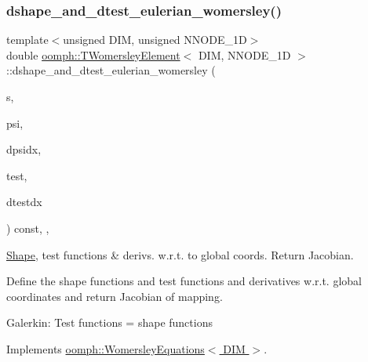 \mbox{\label{classoomph_1_1TWomersleyElement_a745f06fe3f040dfe800fb09be9f38f1e}} 
\subsubsection{\texorpdfstring{dshape\+\_\+and\+\_\+dtest\+\_\+eulerian\+\_\+womersley()}{dshape\_and\_dtest\_eulerian\_womersley()}}
{\footnotesize\ttfamily template$<$unsigned D\+IM, unsigned N\+N\+O\+D\+E\+\_\+1D$>$ \\
double \hyperlink{classoomph_1_1TWomersleyElement}{oomph\+::\+T\+Womersley\+Element}$<$ D\+IM, N\+N\+O\+D\+E\+\_\+1D $>$\+::dshape\+\_\+and\+\_\+dtest\+\_\+eulerian\+\_\+womersley (\begin{DoxyParamCaption}\item[{const \hyperlink{classoomph_1_1Vector}{Vector}$<$ double $>$ \&}]{s,  }\item[{\hyperlink{classoomph_1_1Shape}{Shape} \&}]{psi,  }\item[{\hyperlink{classoomph_1_1DShape}{D\+Shape} \&}]{dpsidx,  }\item[{\hyperlink{classoomph_1_1Shape}{Shape} \&}]{test,  }\item[{\hyperlink{classoomph_1_1DShape}{D\+Shape} \&}]{dtestdx }\end{DoxyParamCaption}) const\hspace{0.3cm}{\ttfamily [inline]}, {\ttfamily [protected]}, {\ttfamily [virtual]}}



\hyperlink{classoomph_1_1Shape}{Shape}, test functions \& derivs. w.\+r.\+t. to global coords. Return Jacobian. 

Define the shape functions and test functions and derivatives w.\+r.\+t. global coordinates and return Jacobian of mapping.

Galerkin\+: Test functions = shape functions 

Implements \hyperlink{classoomph_1_1WomersleyEquations_a26d31e02c3fb483c76402823e09d67c7}{oomph\+::\+Womersley\+Equations$<$ D\+I\+M $>$}.



